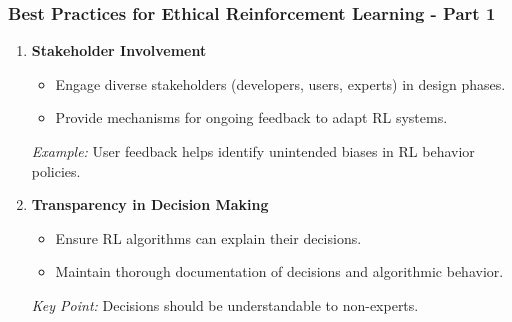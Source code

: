 \documentclass[aspectratio=169]{beamer}
\begin{document}
\begin{frame}[fragile]
    \frametitle{Best Practices for Ethical Reinforcement Learning - Part 1}
    \begin{enumerate}
        \item \textbf{Stakeholder Involvement}
            \begin{itemize}
                \item Engage diverse stakeholders (developers, users, experts) in design phases.
                \item Provide mechanisms for ongoing feedback to adapt RL systems.
            \end{itemize}
            \textit{Example:} User feedback helps identify unintended biases in RL behavior policies.

        \item \textbf{Transparency in Decision Making}
            \begin{itemize}
                \item Ensure RL algorithms can explain their decisions.
                \item Maintain thorough documentation of decisions and algorithmic behavior.
            \end{itemize}
            \textit{Key Point:} Decisions should be understandable to non-experts.
    \end{enumerate}
\end{frame}
\end{document}

